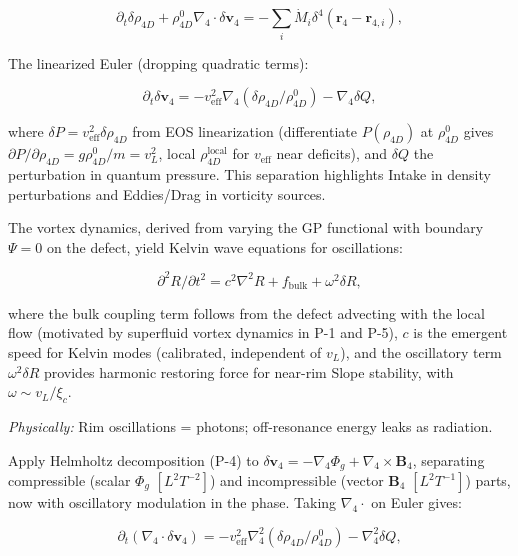 \begin{equation}
\partial_t \delta \rho_{4D} + \rho_{4D}^0 \nabla_4 \cdot \delta \mathbf{v}_4 = -\sum_i \dot{M}_i \delta^4(\mathbf{r}_4 - \mathbf{r}_{4,i}),
\end{equation}

The linearized Euler (dropping quadratic terms):

\begin{equation}
\partial_t \delta \mathbf{v}_4 = -v_{\text{eff}}^2 \nabla_4 (\delta \rho_{4D} / \rho_{4D}^0) - \nabla_4 \delta Q,
\end{equation}

where $\delta P = v_{\text{eff}}^2 \delta \rho_{4D}$ from EOS linearization (differentiate $P(\rho_{4D})$ at $\rho_{4D}^0$ gives $\partial P / \partial \rho_{4D} = g \rho_{4D}^0 / m = v_L^2$, local $\rho_{4D}^{\text{local}}$ for $v_{\text{eff}}$ near deficits), and $\delta Q$ the perturbation in quantum pressure. This separation highlights Intake in density perturbations and Eddies/Drag in vorticity sources.

The vortex dynamics, derived from varying the GP functional with boundary $\Psi=0$ on the defect, yield Kelvin wave equations for oscillations:

\begin{equation}
\partial^2 R / \partial t^2 = c^2 \nabla^2 R + f_{\text{bulk}} + \omega^2 \delta R,
\end{equation}

where the bulk coupling term follows from the defect advecting with the local flow (motivated by superfluid vortex dynamics in P-1 and P-5), $c$ is the emergent speed for Kelvin modes (calibrated, independent of $v_L$), and the oscillatory term $\omega^2 \delta R$ provides harmonic restoring force for near-rim Slope stability, with $\omega \sim v_L / \xi_c$.

\textit{Physically:} Rim oscillations = photons; off-resonance energy leaks as radiation.

Apply Helmholtz decomposition (P-4) to $\delta \mathbf{v}_4 = -\nabla_4 \Phi_g + \nabla_4 \times \mathbf{B}_4$, separating compressible (scalar $\Phi_g$ $[L^2 T^{-2}]$) and incompressible (vector $\mathbf{B}_4$ $[L^2 T^{-1}]$) parts, now with oscillatory modulation in the phase. Taking $\nabla_4 \cdot$ on Euler gives:

\begin{equation}
\partial_t (\nabla_4 \cdot \delta \mathbf{v}_4) = -v_{\text{eff}}^2 \nabla_4^2 (\delta \rho_{4D} / \rho_{4D}^0) - \nabla_4^2 \delta Q,
\end{equation}

